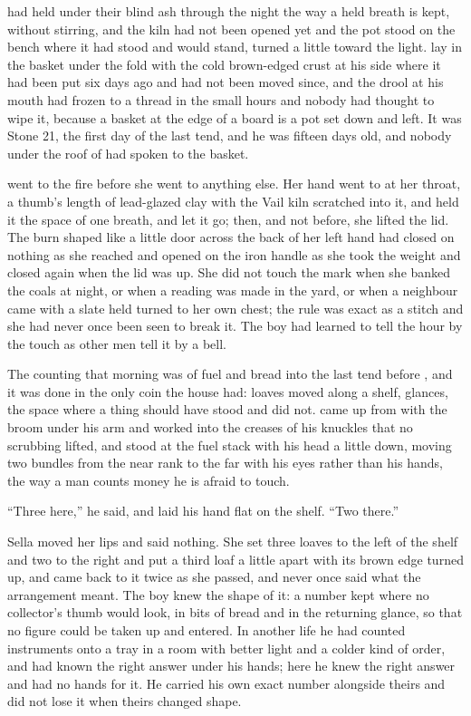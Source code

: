 
 had held under their blind ash through the night the way a held breath is kept, without stirring, and the kiln had not been opened yet and the pot stood on the bench where it had stood and would stand, turned a little toward the light.  lay in the basket under the fold with the cold brown-edged crust at his side where it had been put six days ago and had not been moved since, and the drool at his mouth had frozen to a thread in the small hours and nobody had thought to wipe it, because a basket at the edge of a board is a pot set down and left. It was Stone 21, the first day of the last tend, and he was fifteen days old, and nobody under the roof of  had spoken to the basket.

 went to the fire before she went to anything else. Her hand went to  at her throat, a thumb's length of lead-glazed clay with the Vail kiln scratched into it, and held it the space of one breath, and let it go; then, and not before, she lifted the lid. The burn shaped like a little door across the back of her left hand had closed on nothing as she reached and opened on the iron handle as she took the weight and closed again when the lid was up. She did not touch the mark when she banked the coals at night, or when a reading was made in the yard, or when a neighbour came with a slate held turned to her own chest; the rule was exact as a stitch and she had never once been seen to break it. The boy had learned to tell the hour by the touch as other men tell it by a bell.

The counting that morning was of fuel and bread into the last tend before , and it was done in the only coin the house had: loaves moved along a shelf, glances, the space where a thing should have stood and did not.  came up from  with the broom under his arm and  worked into the creases of his knuckles that no scrubbing lifted, and stood at the fuel stack with his head a little down, moving two bundles from the near rank to the far with his eyes rather than his hands, the way a man counts money he is afraid to touch.

“Three here,” he said, and laid his hand flat on the shelf. “Two there.”

Sella moved her lips and said nothing. She set three loaves to the left of the shelf and two to the right and put a third loaf a little apart with its brown edge turned up, and came back to it twice as she passed, and never once said what the arrangement meant. The boy knew the shape of it: a number kept where no collector's thumb would look, in bits of bread and in the returning glance, so that no figure could be taken up and entered. In another life he had counted instruments onto a tray in a room with better light and a colder kind of order, and had known the right answer under his hands; here he knew the right answer and had no hands for it. He carried his own exact number alongside theirs and did not lose it when theirs changed shape.

